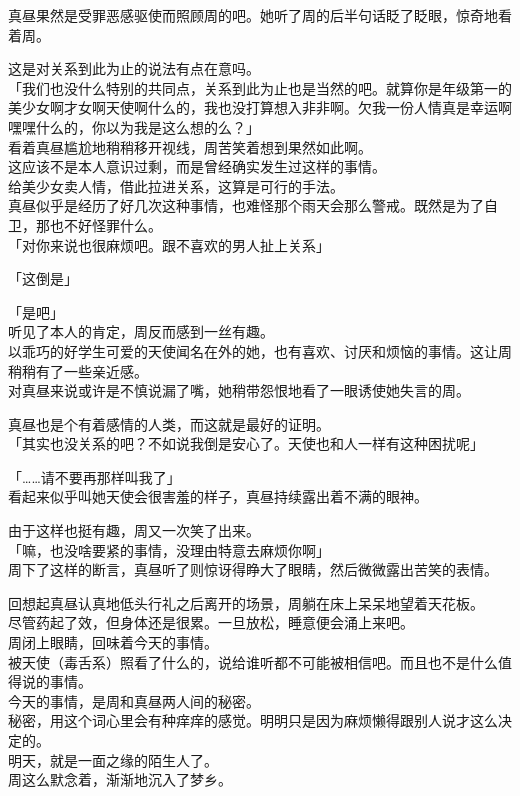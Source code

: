 真昼果然是受罪恶感驱使而照顾周的吧。她听了周的后半句话眨了眨眼，惊奇地看着周。

这是对关系到此为止的说法有点在意吗。\\

「我们也没什么特别的共同点，关系到此为止也是当然的吧。就算你是年级第一的美少女啊才女啊天使啊什么的，我也没打算想入非非啊。欠我一份人情真是幸运啊嘿嘿什么的，你以为我是这么想的么？」\\

看着真昼尴尬地稍稍移开视线，周苦笑着想到果然如此啊。\\

这应该不是本人意识过剩，而是曾经确实发生过这样的事情。\\

给美少女卖人情，借此拉进关系，这算是可行的手法。\\

真昼似乎是经历了好几次这种事情，也难怪那个雨天会那么警戒。既然是为了自卫，那也不好怪罪什么。\\

「对你来说也很麻烦吧。跟不喜欢的男人扯上关系」

「这倒是」

「是吧」\\

听见了本人的肯定，周反而感到一丝有趣。\\

以乖巧的好学生可爱的天使闻名在外的她，也有喜欢、讨厌和烦恼的事情。这让周稍稍有了一些亲近感。\\

对真昼来说或许是不慎说漏了嘴，她稍带怨恨地看了一眼诱使她失言的周。

真昼也是个有着感情的人类，而这就是最好的证明。\\

「其实也没关系的吧？不如说我倒是安心了。天使也和人一样有这种困扰呢」

「……请不要再那样叫我了」\\

看起来似乎叫她天使会很害羞的样子，真昼持续露出着不满的眼神。

由于这样也挺有趣，周又一次笑了出来。\\

「嘛，也没啥要紧的事情，没理由特意去麻烦你啊」\\

周下了这样的断言，真昼听了则惊讶得睁大了眼睛，然后微微露出苦笑的表情。\\

\vspace{2\baselineskip}

回想起真昼认真地低头行礼之后离开的场景，周躺在床上呆呆地望着天花板。\\

尽管药起了效，但身体还是很累。一旦放松，睡意便会涌上来吧。\\

周闭上眼睛，回味着今天的事情。\\

被天使（毒舌系）照看了什么的，说给谁听都不可能被相信吧。而且也不是什么值得说的事情。\\

今天的事情，是周和真昼两人间的秘密。\\

秘密，用这个词心里会有种痒痒的感觉。明明只是因为麻烦懒得跟别人说才这么决定的。\\

明天，就是一面之缘的陌生人了。\\

周这么默念着，渐渐地沉入了梦乡。
